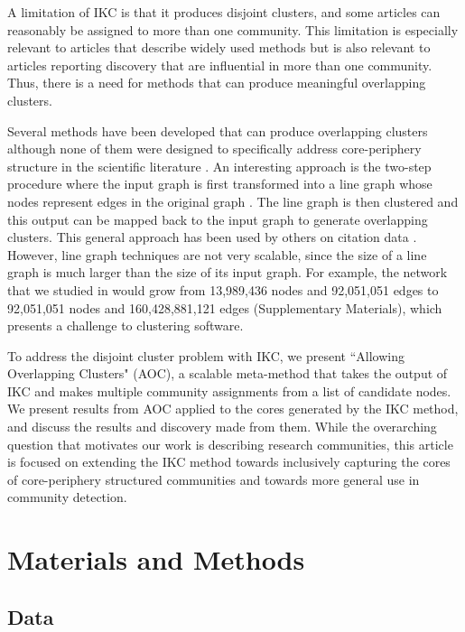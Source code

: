 \documentclass[12pt, oneside]{article}   	%
\begin{document}
A limitation of IKC is that  it produces disjoint clusters, and some articles can reasonably be assigned to more than one community. This limitation is especially relevant to articles that describe widely used methods but is also relevant to articles reporting discovery that are influential in more than one community.  Thus, there is a need for methods that can produce meaningful overlapping clusters. 

Several methods have been developed that can produce overlapping clusters although none of them were designed to specifically address core-periphery structure in the scientific literature  \citep{Baumes2005,Palla2005,banerjee2005model,Cleuziou2008,Lancichinetti2009,Lu2012}. An interesting approach is the two-step procedure where the input graph is first transformed into a line graph whose nodes represent edges in the original graph \citep{Harary1960}.  The line graph is then clustered and this output can be mapped back to the input graph to generate overlapping clusters. This general approach has been used by others on citation data \citep{Evans2009,Havemann2021}. However, line graph  techniques are not very scalable, since the size of a line graph is much larger than the size of its input graph. For example, the network that we studied in \cite{Wedell2022} would grow from 13,989,436 nodes and 92,051,051 edges to 92,051,051 nodes and 160,428,881,121 edges (Supplementary Materials), which presents a challenge to clustering software.
 
To address the disjoint cluster problem with IKC, we present ``Allowing Overlapping Clusters" (AOC), a scalable meta-method that takes the output of IKC and makes multiple community assignments from a list of candidate nodes. We present results from AOC applied to the cores generated by the IKC method, and discuss the results and discovery made from them. While the overarching question that motivates our work is describing research communities, this article is focused on 
extending the IKC method towards inclusively capturing the cores of core-periphery structured communities and towards more general use in community detection. 
 
\section{Materials and Methods}

\subsection{Data} 
\end{document}
